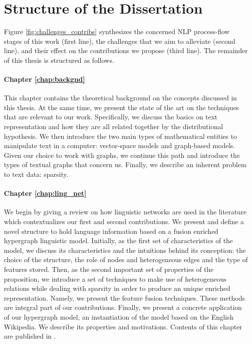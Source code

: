 \section{Structure of the Dissertation}

Figure \ref{fig:challenges_contribs} synthesizes the concerned NLP process-flow stages of this work (first line), the challenges that we aim to alleviate (second line), and their effect on the contributions we propose (third line). The remainder of this thesis is structured as follows. 

\paragraph{Chapter \ref{chap:backgnd}} This chapter contains the theoretical background on the concepts discussed in this thesis. At the same time, we present the state of the art on the techniques that are relevant to our work. Specifically, we discuss the basics on text representation and how they are all related together by the distributional hypothesis. We then introduce the two main types of mathematical entities to manipulate text in a computer: vector-space models and graph-based models. Given our choice to work with graphs, we continue this path and introduce the types of textual graphs that concern us. Finally, we describe an inherent problem to text data: sparsity.

\paragraph{Chapter \ref{chap:ling_net}} We begin by giving a review on how linguistic networks are used in the literature which contextualizes our first and second contributions. We present and define a novel structure to hold language information based on a fusion enriched hypergraph linguistic model.  Initially, as the first set of characteristics of the model, we discuss its characteristics and the intuitions behind its conception: the choice of the structure, the role of nodes and heterogeneous edges and the type of features stored.  Then, as the second important set of properties of the proposition, we introduce a set of techniques to make use of heterogeneous relations while dealing with sparsity in order to produce an unique enriched representation. Namely, we present the feature fusion techniques. These methods are integral part of our contributions. Finally, we present a concrete application of our hypergraph model, an instantiation of the model based on the English Wikipedia. We describe its properties and motivations. Contents of this chapter are published in \cite{sorianoJournal,sorianoLREC,sorianoEGCChallenge}.

